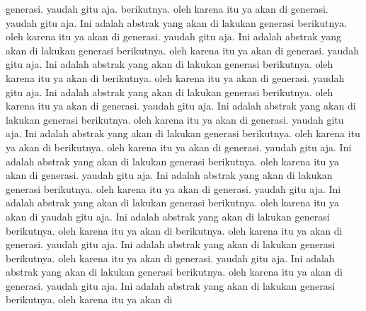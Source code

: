 generasi. yaudah gitu aja. berikutnya. oleh karena itu ya akan di generasi. yaudah gitu aja. Ini adalah abstrak yang akan di lakukan generasi berikutnya. oleh karena itu ya akan di generasi. yaudah gitu aja. Ini adalah abstrak yang akan di lakukan generasi berikutnya. oleh karena itu ya akan di generasi. yaudah gitu aja. Ini adalah abstrak yang akan di lakukan generasi berikutnya. oleh karena itu ya akan di berikutnya. oleh karena itu ya akan di generasi. yaudah gitu aja. Ini adalah abstrak yang akan di lakukan generasi berikutnya. oleh karena itu ya akan di generasi. yaudah gitu aja. Ini adalah abstrak yang akan di lakukan generasi berikutnya. oleh karena itu ya akan di generasi. yaudah gitu aja. Ini adalah abstrak yang akan di lakukan generasi berikutnya. oleh karena itu ya akan di berikutnya. oleh karena itu ya akan di generasi. yaudah gitu aja. Ini adalah abstrak yang akan di lakukan generasi berikutnya. oleh karena itu ya akan di generasi. yaudah gitu aja. Ini adalah abstrak yang akan di lakukan generasi berikutnya. oleh karena itu ya akan di generasi. yaudah gitu aja. Ini adalah abstrak yang akan di lakukan generasi berikutnya. oleh karena itu ya akan di yaudah gitu aja. Ini adalah abstrak yang akan di lakukan generasi berikutnya. oleh karena itu ya akan di berikutnya. oleh karena itu ya akan di generasi. yaudah gitu aja. Ini adalah abstrak yang akan di lakukan generasi berikutnya. oleh karena itu ya akan di generasi. yaudah gitu aja. Ini adalah abstrak yang akan di lakukan generasi berikutnya. oleh karena itu ya akan di generasi. yaudah gitu aja. Ini adalah abstrak yang akan di lakukan generasi berikutnya. oleh karena itu ya akan di 